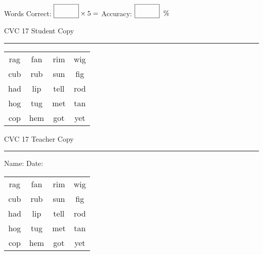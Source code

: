 \documentclass{memoir}
\begin{document}
\normalsize

Words Correct: $\fbox{\phantom{\huge 100}} \times 5 = $ Accuracy: $\fbox{\phantom{\huge 100}}\;\; \%$ 

\vfill

\newpage


\footnotesize \noindent
CVC 17 \hfill Student Copy
\smallskip
\hrule

\huge

\setlength{\tabcolsep}{14pt}
\def\arraystretch{2}

{\selectfont


\begin{vplace}[0.5]
\begin{center}
\begin{tabular}{cccc}
rag & fan & rim & wig \\
cub & rub & sun & fig \\
had & lip & tell & rod \\
hog & tug & met & tan \\
cop & hem & got & yet \\
\end{tabular}
\end{center}
\end{vplace}

}

\newpage

\footnotesize \noindent
CVC 17 \hfill Teacher Copy
\smallskip
\hrule

\normalsize

\vfill

\noindent
Name: \underline{\hspace{1.75in}} \hfill Date: \underline{\hspace{1in}}

\huge

{\selectfont


\begin{vplace}[0.5]
\begin{center}
\begin{tabular}{cccc}
rag & fan & rim & wig \\
cub & rub & sun & fig \\
had & lip & tell & rod \\
hog & tug & met & tan \\
cop & hem & got & yet \\
\end{tabular}
\end{center}
\end{vplace}



}
\end{document}
